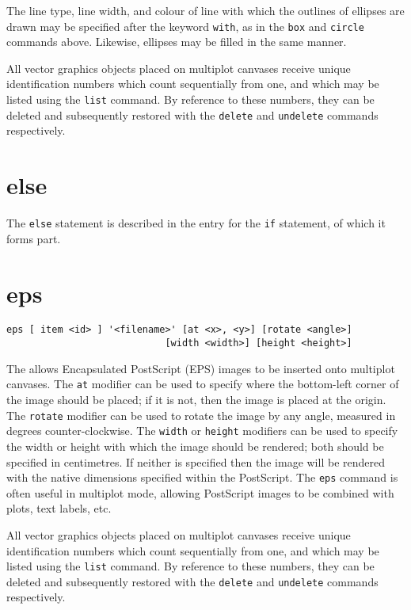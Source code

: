 The line type, line width, and colour of line with which the outlines of
ellipses are drawn may be specified after the keyword {\tt with}, as in the
{\tt box} and {\tt circle} commands above. Likewise, ellipses may be filled in
the same manner.

All vector graphics objects placed on multiplot canvases receive unique
identification numbers which count sequentially from one, and which may be
listed using the {\tt list} command.  By reference to these numbers, they can
be deleted and subsequently restored with the {\tt delete} and {\tt undelete}
commands respectively.


\section{else}

The {\tt else} statement is described in the entry for the {\tt if}
statement, of which it forms part.


\section{eps}

\begin{verbatim}
eps [ item <id> ] '<filename>' [at <x>, <y>] [rotate <angle>]
                            [width <width>] [height <height>]
\end{verbatim}

The  allows Encapsulated PostScript (EPS) images to be inserted
onto multiplot canvases.  The {\tt at} modifier can be used to specify where
the bottom-left corner of the image should be placed; if it is not, then the
image is placed at the origin. The {\tt rotate} modifier can be used to rotate
the image by any angle, measured in degrees counter-clockwise.  The {\tt width}
or {\tt height} modifiers can be used to specify the width or height with which
the image should be rendered; both should be specified in centimetres. If
neither is specified then the image will be rendered with the native dimensions
specified within the PostScript.  The {\tt eps} command is often useful in
multiplot mode, allowing PostScript images to be combined with plots, text
labels, etc.

All vector graphics objects placed on multiplot canvases receive unique
identification numbers which count sequentially from one, and which may be
listed using the {\tt list} command.  By reference to these numbers, they can
be deleted and subsequently restored with the {\tt delete} and {\tt undelete}
commands respectively.


